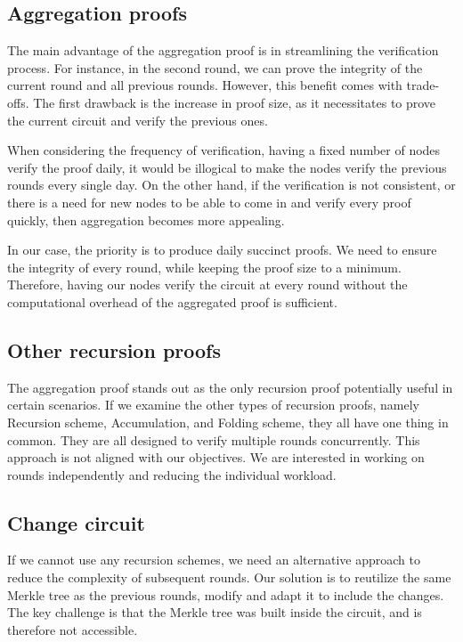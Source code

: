 \subsection{Aggregation proofs}
The main advantage of the aggregation proof is in streamlining the verification process. For instance, in the second round, we can prove the integrity of the current round and all previous rounds.
However, this benefit comes with trade-offs. The first drawback is the increase in proof size, as it necessitates to prove the current circuit and verify the previous ones.

When considering the frequency of verification, having a fixed number of nodes verify the proof daily, it would be illogical to make the nodes verify the previous rounds every single day.
On the other hand, if the verification is not consistent, or there is a need for new nodes to be able to come in and verify every proof quickly, then aggregation becomes more appealing.

In our case, the priority is to produce daily succinct proofs. We need to ensure the integrity of every round, while keeping the proof size to a minimum.
Therefore, having our nodes verify the circuit at every round without the computational overhead of the aggregated proof is sufficient.

\subsection{Other recursion proofs}
The aggregation proof stands out as the only recursion proof potentially useful in certain scenarios.
If we examine the other types of recursion proofs, namely Recursion scheme, Accumulation, and Folding scheme, they all have one thing in common.
They are all designed to verify multiple rounds concurrently.
This approach is not aligned with our objectives. We are interested in working on rounds independently and reducing the individual workload.

\subsection{Change circuit}
If we cannot use any recursion schemes, we need an alternative approach to reduce the complexity of subsequent rounds.
Our solution is to reutilize the same Merkle tree as the previous rounds, modify and adapt it to include the changes.
The key challenge is that the Merkle tree was built inside the circuit, and is therefore not accessible.

